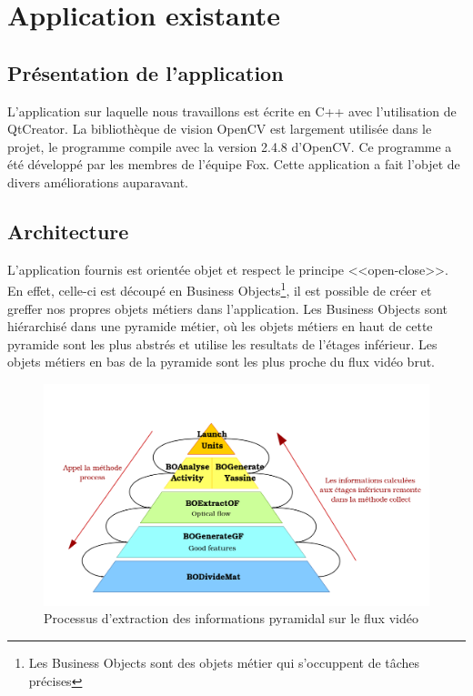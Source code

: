\section{Application existante}

\subsection{Présentation de l'application}
L'application sur laquelle nous travaillons est écrite en C++ avec l'utilisation de QtCreator. 
La bibliothèque de vision OpenCV  est largement utilisée dans le projet, le programme 
compile avec la version 2.4.8 d'OpenCV. Ce programme a été développé par les membres de l'équipe 
Fox. Cette application a fait l'objet de divers améliorations auparavant.\\

\subsection{Architecture}
L'application fournis est orientée objet et respect le principe <<open-close>>. En effet, celle-ci est 
découpé en Business Objects\footnote{Les Business Objects sont des objets métier qui s'occuppent de tâches 
précises}, il est possible de créer et greffer nos propres objets métiers dans l'application. Les Business 
Objects sont hiérarchisé dans une pyramide métier, où les objets métiers en haut de cette pyramide 
sont les plus abstrés et utilise les resultats de l'étages inférieur. Les objets métiers en bas de 
la pyramide sont les plus proche du flux vidéo brut.\\

\begin{figure}[H]
  \centering
  \includegraphics[width=12.5cm]{image/pyramide.png}
  \caption{Processus d'extraction des informations pyramidal sur le flux vidéo}
\end{figure}

